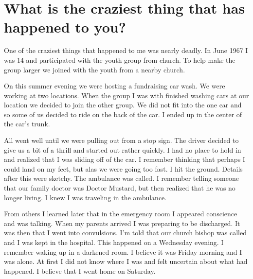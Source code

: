 \section{What is the craziest thing that has happened to you?}
One of the craziest things that happened to me was nearly deadly.
In June 1967 I was 14 and participated with the youth group from church.
To help make the group larger we joined with the youth from a nearby church.

On this summer evening we were hosting a fundraising car wash.
We were working at two locations.
When the group I was with finished washing cars at our location we decided to join the other group.
We did not fit into the one car and so some of us decided to ride on the back of the car.
I ended up in the center of the car's trunk.

All went well until we were pulling out from a stop sign.
The driver decided to give us a bit of a thrill and started out rather quickly.
I had no place to hold in and realized that I was sliding off of the car.
I remember thinking that perhaps I could land on my feet, but alas we were going too fast.
I hit the ground.
Details after this were sketchy.
The ambulance was called.
I remember telling someone that our family doctor was Doctor Mustard, but then realized that he was no longer living.
I knew I was traveling in the ambulance.

From others I learned later that in the emergency room I appeared conscience and was talking.
When my parents arrived I was preparing to be discharged.
It was then that I went into convulsions.
I'm told that our church bishop was called and I was kept in the hospital.
This happened on a Wednesday evening.
I remember waking up in a darkened room.
I believe it was Friday morning and I was alone.
At first I did not know where I was and felt uncertain about what had happened.
I believe that I went home on Saturday.





